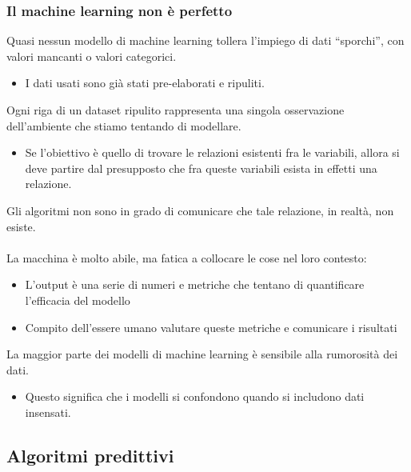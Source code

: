 \documentclass[../main.tex]{subfiles}
\begin{document}
	\subsubsection{Il machine learning non è perfetto} 
	Quasi nessun modello di machine learning tollera l’impiego di dati “sporchi”, con valori mancanti o valori categorici. 
	\begin{itemize}
		\item I dati usati sono già stati pre-elaborati e ripuliti.
	\end{itemize}
	Ogni riga di un dataset ripulito rappresenta una singola osservazione dell’ambiente che stiamo tentando di modellare. 
	\begin{itemize}
		\item Se l’obiettivo è quello di trovare le relazioni esistenti fra le variabili, allora si deve partire dal presupposto che fra queste variabili esista in effetti una relazione.
	\end{itemize}
	Gli algoritmi non sono in grado di comunicare che tale relazione, in realtà, non esiste.\\\\
	La macchina è molto abile, ma fatica a collocare le cose nel loro contesto: 
	\begin{itemize}
		\item L’output è una serie di numeri e metriche che tentano di quantificare l’efficacia del modello
		\item Compito dell’essere umano valutare queste metriche e comunicare i risultati
	\end{itemize}
	La maggior parte dei modelli di machine learning è sensibile alla rumorosità dei dati. 
	\begin{itemize}
		\item Questo significa che i modelli si confondono quando si includono dati insensati.
	\end{itemize}
	\subsection{Algoritmi predittivi}
\end{document}

